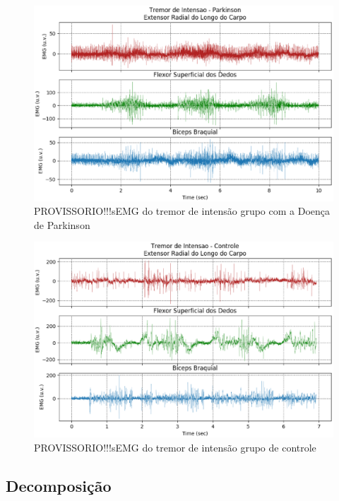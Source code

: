 \begin{figure}[!htb]
   \centering
    \includegraphics[width=1\textwidth]{figuras/tremor_i_parkinson.eps}
    \caption{PROVISSORIO!!!sEMG do tremor de intensão grupo com a Doença de Parkinson}
    \label{tremor_i_parkinson}
\end{figure}

\begin{figure}[!htb]
   \centering
    \includegraphics[width=1\textwidth]{figuras/tremor_intensao.eps}
    \caption{PROVISSORIO!!!sEMG do tremor de intensão grupo de controle}
    \label{tremor_intensao}
\end{figure}

\subsection{Decomposição}


